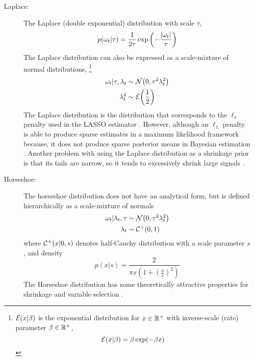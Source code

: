 \begin{description}
\item[Laplace:] The Laplace (double exponential) distribution with scale $\tau$,
\begin{equation}
  \label{dlm:eq:14}
  p(\omega_{t}| \tau) = \frac{1}{2 \tau} \exp 
  \left(
    - \frac{\lvert\omega_{t}\rvert}{\tau}
  \right)
\end{equation}
The Laplace distribution can also be expressed as a scale-mixture of normal distributions,%
\footnote{
  $\mathcal{E}\mathopen{}\left(x | \beta\right)\mathclose{}$ is the exponential distribution for $x \in \mathbb{R}^{+}$ with inverse-scale (rate) parameter $\beta \in \mathbb{R}^{+}$,
    \begin{equation}
      \label{dlm:eq:13}
      \mathcal{E}\mathopen{}\left(x | \beta\right)\mathclose{} = \beta \exp(- \beta x)
    \end{equation}
}
\begin{equation}
  \label{dlm:eq:12}
  \begin{aligned}[t]
  \omega_{t} | \tau, \lambda_{t} &\sim \mathcal{N}\mathopen{}\left(0, \tau^{2} \lambda_{t}^{2}\right)\mathclose{} \\
  \lambda_{t}^{2} & \sim \mathcal{E}\mathopen{}\left(\frac{1}{2}\right)\mathclose{}
  \end{aligned}
\end{equation}
The Laplace distribution is the distribution that corresponds to the $\ell_{1}$ penalty used in the LASSO estimator \parencites{ParkCasella2008}{Hans2009}.
However, although an $\ell_{1}$ penalty is able to produce sparse estimates in a maximum likelihood framework because, it does not produce sparse posterior means in Bayesian estimation \parencites{ParkCasella2008}.
Another problem with using the Laplace distribution as a shrinkage prior is that its tails are narrow, so it tends to excessively shrink large signals \parencites{CarvalhoPolsonScott2010}.

\item[Horseshoe:] The horseshoe distribution \parencites{CarvalhoPolsonScott2009}{CarvalhoPolsonScott2010} does not have an analytical form, but is defined hierarchically as a scale-mixture of normals
\begin{equation}
  \label{dlm:eq:7}
  \begin{aligned}[t]
    \omega_{t} | \lambda_{t}, \tau & \sim \mathcal{N}\mathopen{}\left(0, \tau^{2} \lambda_{t}^{2}\right)\mathclose{} \\
    \lambda_{t}  & \sim \mathcal{C^+}\mathopen{}\left(0, 1\right)\mathclose{}
  \end{aligned}
\end{equation}
where $\mathcal{C^+}\mathopen{}\left(x | 0, s\right)\mathclose{}$ denotes half-Cauchy distribution with a scale parameter $s$, and density
\begin{equation}
  \label{dlm:eq:8}
  p(x | s) = \frac{2}{\pi x \left(1 + {\left(\frac{x}{s}\right)}^{2}\right)}
\end{equation}
The Horseshoe distribution has some theoretically attractive properties for shrinkage and variable selection \parencites{CarvalhoPolsonScott2009}{CarvalhoPolsonScott2010}{DattaGhosh2012}{PasKleijnVaart2014a}.


\end{description}
